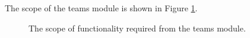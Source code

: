 The scope of the teams module is shown in Figure \ref{fig:teamss_scope}. 

\begin{figure}[htb]
\begin{center}
\end{center}
\caption{The scope of functionality required from the teams module. \label{fig:teamss_scope}}
\end{figure}



